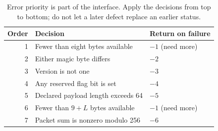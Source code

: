 \begin{table}[htbp]
  \centering
  \small
  \begin{tabular}{rll}
    \toprule
    Order & Decision                           & Return on failure \\
    \midrule
    1     & Fewer than eight bytes available   & $-1$ (need more)  \\
    2     & Either magic byte differs          & $-2$              \\
    3     & Version is not one                 & $-3$              \\
    4     & Any reserved flag bit is set       & $-4$              \\
    5     & Declared payload length exceeds 64 & $-5$              \\
    6     & Fewer than $9+L$ bytes available   & $-1$ (need more)  \\
    7     & Packet sum is nonzero modulo 256   & $-6$              \\
    \bottomrule
  \end{tabular}
  \caption{Error priority is part of the interface. Apply the decisions from top to bottom; do not let a later defect replace an earlier status.}
  \label{tab:revision-bounded-priority}
\end{table}
